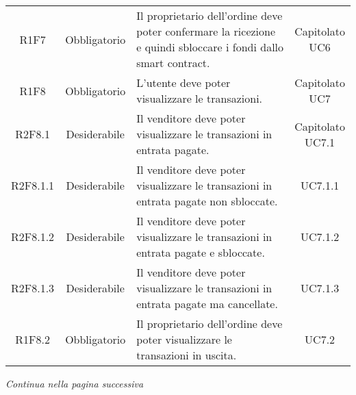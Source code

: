 \begin{table}[H]
\begin{tabular}{c | c | p{6cm} | c}
        R1F7                                                              & Obbligatorio & Il proprietario dell'ordine deve poter confermare la ricezione e quindi sbloccare i fondi dallo smart contract\glo{}. & \Shortunderstack{Capitolato\\UC6\\}   \\
        R1F8                                                              & Obbligatorio & L'utente deve poter visualizzare le transazioni.                                                                      & \Shortunderstack{Capitolato\\UC7\\}   \\
        R2F8.1                                                            & Desiderabile & Il venditore deve poter visualizzare le transazioni in entrata pagate.                                                & \Shortunderstack{Capitolato\\UC7.1\\} \\
        R2F8.1.1                                                          & Desiderabile & Il venditore deve poter visualizzare le transazioni in entrata pagate non sbloccate.                                  & UC7.1.1                               \\
        R2F8.1.2                                                          & Desiderabile & Il venditore deve poter visualizzare le transazioni in entrata pagate e sbloccate.                                    & UC7.1.2                               \\
        R2F8.1.3                                                          & Desiderabile & Il venditore deve poter visualizzare le transazioni in entrata pagate ma cancellate.                                  & UC7.1.3                               \\
        R1F8.2                                                            & Obbligatorio & Il proprietario dell'ordine deve poter visualizzare le transazioni in uscita.                                         & UC7.2                                 \\
    \end{tabular}
\end{table}
\begin{center}
    \textit{\small Continua nella pagina successiva}
\end{center}
